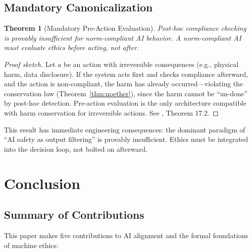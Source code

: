 \documentclass[12pt]{article}
\newtheorem{theorem}{Theorem}[section]
\theoremstyle{definition}
\theoremstyle{remark}
\begin{document}
\subsection{Mandatory Canonicalization}

\begin{theorem}[Mandatory Pre-Action Evaluation]
\label{thm:mandatory}
Post-hoc compliance checking is provably insufficient for norm-compliant AI behavior. A norm-compliant AI must evaluate ethics \emph{before} acting, not after.
\end{theorem}

\begin{proof}[Proof sketch]
Let $a$ be an action with irreversible consequences (e.g., physical harm, data disclosure). If the system acts first and checks compliance afterward, and the action is non-compliant, the harm has already occurred---violating the conservation law (Theorem~\ref{thm:noether}), since the harm cannot be ``un-done'' by post-hoc detection. Pre-action evaluation is the only architecture compatible with harm conservation for irreversible actions. See \citet{anon2026a}, Theorem 17.2.
\end{proof}

This result has immediate engineering consequences: the dominant paradigm of ``AI safety as output filtering'' is provably insufficient. Ethics must be integrated into the decision loop, not bolted on afterward.


\section{Conclusion}
\label{sec:conclusion}

\subsection{Summary of Contributions}

This paper makes five contributions to AI alignment and the formal foundations of machine ethics:
\end{document}
